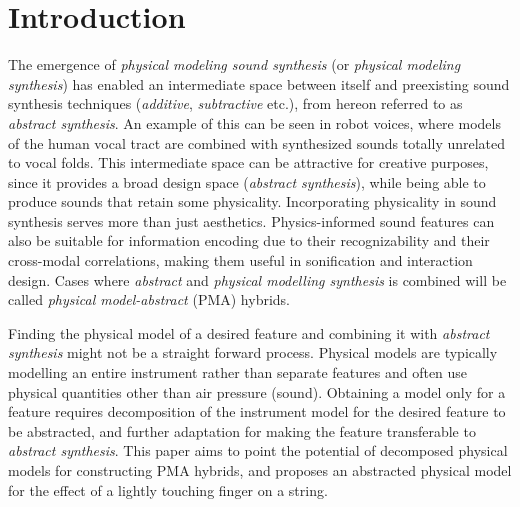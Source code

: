 \documentclass{sigchi}
\def\plainkeywords{physical modelling; audio features}
\begin{document}

\keywords{\plainkeywords}

\printccsdesc

\section{Introduction}
The emergence of \textit{physical modeling sound synthesis} (or \textit{physical modeling synthesis}) has enabled an intermediate space between itself and preexisting sound synthesis techniques (\textit{additive}, \textit{subtractive} etc.), from hereon referred to as \textit{abstract synthesis}.
An example of this can be seen in robot voices, where models of the human vocal tract are combined with synthesized sounds totally unrelated to vocal folds.
This intermediate space can be attractive for creative purposes, since it provides a broad design space (\textit{abstract synthesis}), while being able to produce sounds that retain some physicality.
Incorporating physicality in sound synthesis serves more than just aesthetics.
Physics-informed sound features can also be suitable for information encoding due to their recognizability and their cross-modal correlations, making them useful in sonification and interaction design.
Cases where \textit{abstract} and \textit{physical modelling synthesis} is combined will be called \textit{physical model-abstract} (PMA) hybrids.

Finding the physical model of a desired feature and combining it with \textit{abstract synthesis} might not be a straight forward process.
Physical models are typically modelling an entire instrument rather than separate features and often use physical quantities other than air pressure (sound).
Obtaining a model only for a feature requires decomposition of the instrument model for the desired feature to be abstracted, and further adaptation for making the feature transferable to \textit{abstract synthesis}.
This paper aims to point the potential of decomposed physical models for constructing PMA hybrids, and proposes an abstracted physical model for the effect of a lightly touching finger on a string.
\end{document}
